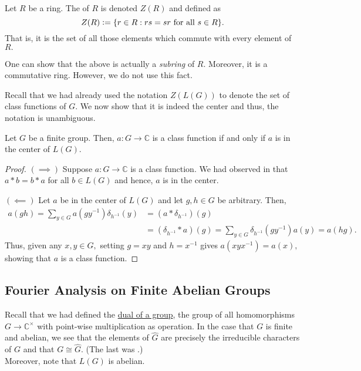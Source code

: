\documentclass[12pt]{article}	%
\begin{document}
\begin{defn}
    Let $R$ be a ring. The  of $R$ is denoted $Z(R)$ and defined as
    \begin{equation*}
        Z(R) \vcentcolon= \{r \in R : rs = sr \text{ for all } s \in R\}.
    \end{equation*}
    That is, it is the set of all those elements which commute with every element of $R.$
\end{defn}

\begin{rem}
    One can show that the above is actually a \emph{subring} of $R.$ Moreover, it is a commutative ring. However, we do not use this fact.
\end{rem}

Recall that we had already used the notation $Z(L(G))$ to denote the set of class functions of $G.$ We now show that it is indeed the center and thus, the notation is unambiguous.

\begin{prop}
    Let $G$ be a finite group. Then, $a : G \to \mathbb{C}$ is a class function if and only if $a$ is in the center of $L(G).$
\end{prop}
\begin{proof}
    $(\implies)$ Suppose $a : G \to \mathbb{C}$ is a class function. We had observed in  that $a * b = b * a$ for all $b \in L(G)$ and hence, $a$ is in the center.
    
    $(\impliedby)$ Let $a$ be in the center of $L(G)$ and let $g, h \in G$ be arbitrary. Then,
    \begin{align*}
        a(gh) = \sum_{y \in G} a(gy^{-1})\delta_{h^{-1}}(y) &= (a * \delta_{h^{-1}})(g) \\
        &= (\delta_{h^{-1}} * a)(g) = \sum_{y \in G}\delta_{h^{-1}}(gy^{-1})a(y) = a(hg).
    \end{align*}
    Thus, given any $x, y \in G,$ setting $g = xy$ and $h = x^{-1}$ gives $a(xyx^{-1}) = a(x),$ showing that $a$ is a class function.
\end{proof}

\subsection{Fourier Analysis on Finite Abelian Groups}

Recall that we had defined the \hyperref[defn:dualgroup]{dual of a group}, the group of all homomorphisms $G \to \mathbb{C}^\times$ with point-wise multiplication as operation. In the case that $G$ is finite and abelian, we see that the elements of $\widehat{G}$ are precisely the irreducible characters of $G$ and that $G \cong \widehat{G}.$ (The last was .) \\
Moreover, note that $L(G)$ is abelian. 
\end{document}
